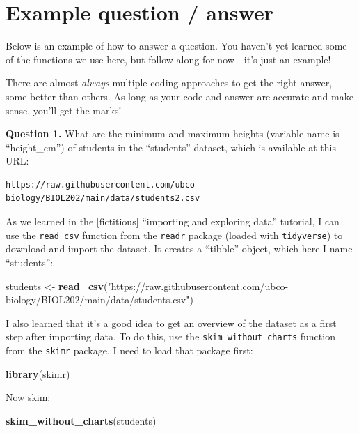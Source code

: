 \documentclass[
]{book}
\newenvironment{Shaded}{\begin{snugshade}}{\end{snugshade}}
\newcommand{\FunctionTok}[1]{\textcolor[rgb]{0.13,0.29,0.53}{\textbf{#1}}}
\newcommand{\NormalTok}[1]{#1}
\newcommand{\OtherTok}[1]{\textcolor[rgb]{0.56,0.35,0.01}{#1}}
\newcommand{\StringTok}[1]{\textcolor[rgb]{0.31,0.60,0.02}{#1}}
\begin{document}
\section{Example question / answer}\label{example_answer}

Below is an example of how to answer a question. You haven't yet learned some of the functions we use here, but follow along for now - it's just an example!

There are almost \emph{always} multiple coding approaches to get the right answer, some better than others. As long as your code and answer are accurate and make sense, you'll get the marks!

\textbf{Question 1.} What are the minimum and maximum heights (variable name is ``height\_cm'') of students in the ``students'' dataset, which is available at this URL:

\begin{verbatim}
https://raw.githubusercontent.com/ubco-biology/BIOL202/main/data/students2.csv
\end{verbatim}

As we learned in the {[}fictitious{]} ``importing and exploring data'' tutorial, I can use the \texttt{read\_csv} function from the \texttt{readr} package (loaded with \texttt{tidyverse}) to download and import the dataset. It creates a ``tibble'' object, which here I name ``students'':

\begin{Shaded}
\begin{Highlighting}[]
\NormalTok{students }\OtherTok{\textless{}{-}} \FunctionTok{read\_csv}\NormalTok{(}\StringTok{"https://raw.githubusercontent.com/ubco{-}biology/BIOL202/main/data/students.csv"}\NormalTok{)}
\end{Highlighting}
\end{Shaded}

I also learned that it's a good idea to get an overview of the dataset as a first step after importing data. To do this, use the \texttt{skim\_without\_charts} function from the \texttt{skimr} package. I need to load that package first:

\begin{Shaded}
\begin{Highlighting}[]
\FunctionTok{library}\NormalTok{(skimr)}
\end{Highlighting}
\end{Shaded}

Now skim:

\begin{Shaded}
\begin{Highlighting}[]
\FunctionTok{skim\_without\_charts}\NormalTok{(students)}
\end{Highlighting}
\end{Shaded}
\end{document}
